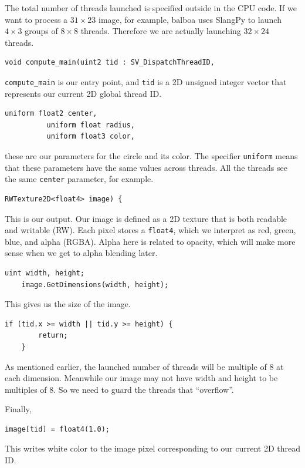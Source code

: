 The total number of threads launched is specified outside in the CPU code. If we want to process a $31 \times 23$ image, for example,
balboa uses SlangPy to launch $4 \times 3$ groups of $8 \times 8$ threads. Therefore we are actually launching $32 \times 24$ threads.
\begin{lstlisting}[language=Slang]
void compute_main(uint2 tid : SV_DispatchThreadID,
\end{lstlisting}
\lstinline{compute_main} is our entry point, and \lstinline{tid} is a 2D unsigned integer vector that represents our current 2D global thread ID.
\begin{lstlisting}[language=Slang]
          uniform float2 center,
          uniform float radius,
          uniform float3 color,
\end{lstlisting}
these are our parameters for the circle and its color. The specifier \lstinline{uniform} means that these parameters have the same values across threads. All the threads see the same \lstinline{center} parameter, for example.
\begin{lstlisting}[language=Slang]
          RWTexture2D<float4> image) {
\end{lstlisting}
This is our output. Our image is defined as a 2D texture that is both readable and writable (RW). Each pixel stores a \lstinline{float4}, which we interpret as red, green, blue, and alpha (RGBA). Alpha here is related to opacity, which will make more sense when we get to alpha blending later.
\begin{lstlisting}[language=Slang]
    uint width, height;
    image.GetDimensions(width, height);
\end{lstlisting}
This gives us the size of the image.
\begin{lstlisting}[language=Slang]
    if (tid.x >= width || tid.y >= height) {
        return;
    }
\end{lstlisting}
As mentioned earlier, the launched number of threads will be multiple of $8$ at each dimension. Meanwhile our image may not have width and height to be multiples of $8$. So we need to guard the threads that ``overflow''.

Finally,
\begin{lstlisting}[language=Slang]
	image[tid] = float4(1.0);
\end{lstlisting}
This writes white color to the image pixel corresponding to our current 2D thread ID.

